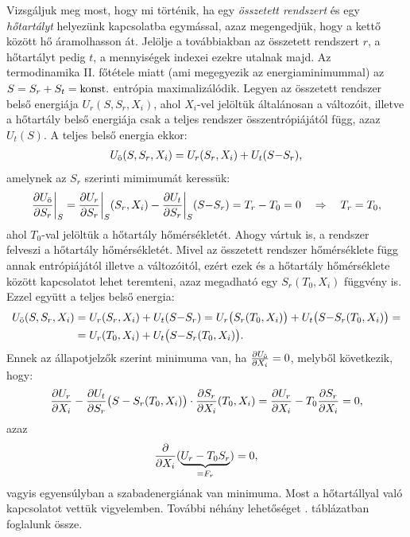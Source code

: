 Vizsgáljuk meg most, hogy mi történik, ha egy \emph{összetett rendszert} és egy \emph{hőtartályt} helyezünk kapcsolatba egymással, azaz megengedjük, hogy a kettő között hő áramolhasson át. Jelölje a továbbiakban az összetett rendszert $r$, a hőtartályt pedig $t$, a mennyiségek indexei ezekre utalnak majd. Az termodinamika II. főtétele miatt (ami megegyezik az energiaminimummal) az $S=S_r+S_t = \textnormal{konst.}$ entrópia maximalizálódik. Legyen az összetett rendszer belső energiája $U_r(S,S_r,X_i)$, ahol $X_i$-vel jelöltük általánosan a változóit, illetve a hőtartály belső energiája csak a teljes rendszer összentrópiájától függ, azaz $U_t(S)$. A teljes belső energia ekkor:
\begin{align}
	U_{\textnormal{ö}}(S,S_r,X_i) = U_r(S_r,X_i) + U_t(S{-}S_r),
\end{align}
amelynek az $S_r$ szerinti mimimumát keressük:
\begin{align}
	\frac{\partial{U_{\textnormal{ö}}}}{\partial{S_r}}\bigg|_S=\frac{\partial{U_r}}{\partial{S_r}}\bigg|_S(S_r,X_i) - \frac{\partial{U_t}}{\partial{S_r}}\bigg|_S(S{-}S_r) = T_r-T_0 = 0\quad\Rightarrow\quad T_r=T_0,
\end{align}
ahol $T_0$-val jelöltük a hőtartály hőmérsékletét. Ahogy vártuk is, a rendszer felveszi a hőtartály hőmérsékletét. Mivel az összetett rendszer hőmérséklete függ annak entrópiájától illetve a változóitól, ezért ezek és a hőtartály hőmérséklete között kapcsolatot lehet teremteni, azaz megadható egy $S_r(T_0,X_i)$ függvény is. Ezzel együtt a teljes belső energia:
\begin{align}
\begin{split}
	U_{\textnormal{ö}} (S,S_r,X_i) &= U_r(S_r,X_i) + U_t(S{-}S_r) = U_r\big(S_r(T_0,X_i)\big) + U_t\big(S{-}S_r(T_0,X_i)\big) =\\
	&= U_r(T_0,X_i) +U_t\big(S{-}S_r(T_0,X_i)\big).
\end{split}
\end{align}
Ennek az állapotjelzők szerint minimuma van, ha $\frac{\partial{U_{\textnormal{ö}}}}{\partial{X_i}}=0$, melyből következik, hogy:
\begin{align}
	\frac{\partial{U_r}}{\partial{X_i}}-\frac{\partial{U_t}}{\partial{S_r}}\big(S-S_r(T_0,X_i)\big)\cdot \frac{\partial{S_r}}{\partial{X_i}}(T_0,X_i) = \frac{\partial{U_r}}{\partial{X_i}}-T_0\frac{\partial{S_r}}{\partial{X_i}}=0,
\end{align}
azaz
\begin{align}
	\frac{\partial{}}{\partial{X_i}}(\underbrace{U_r-T_0S_r}_{=F_r})=0,
\end{align}
vagyis egyensúlyban a szabadenergiának van minimuma. Most a hőtartállyal való kapcsolatot vettük vigyelemben. További néhány lehetőséget . táblázatban foglalunk össze.
